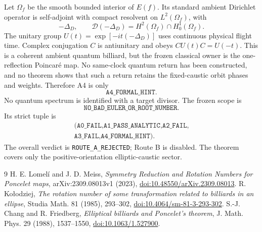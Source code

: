 \documentclass[10pt]{article}
\begin{document}
Let $\Omega_f$ be the smooth bounded interior of $E(f)$.  Its standard ambient
Dirichlet operator is self-adjoint with compact resolvent on
$L^2(\Omega_f)$, with
\[
 -\Delta_D,\qquad
 \mathcal D(-\Delta_D)=H^2(\Omega_f)\cap H_0^1(\Omega_f).
\]
The unitary group $U(t)=\exp[-it(-\Delta_D)]$ uses continuous physical flight
time.  Complex conjugation $C$ is antiunitary and obeys
$CU(t)C=U(-t)$.  This is a coherent ambient quantum billiard, but the frozen
classical owner is the one-reflection Poincar\'e map.  No same-clock quantum
return has been constructed, and no theorem shows that such a return retains
the fixed-caustic orbit phases and weights.  Therefore A4 is only
\[
 \texttt{A4\_FORMAL\_HINT}.
\]
No quantum spectrum is identified with a target divisor.  The frozen scope is
\[
 \texttt{NO\_BAD\_EULER\_OR\_ROOT\_NUMBER}.
\]
Its strict tuple is
\[
 \begin{gathered}
 \texttt{(A0\_FAIL,A1\_PASS\_ANALYTIC,A2\_FAIL,}\\
 \texttt{A3\_FAIL,A4\_FORMAL\_HINT)}.
 \end{gathered}
\]
The overall verdict is \texttt{ROUTE\_A\_REJECTED}; Route B is disabled.  The theorem covers
only the positive-orientation elliptic-caustic sector.
\fi

\begin{thebibliography}{9}
 H. E. Lomel\'i and J. D. Meiss,
\emph{Symmetry Reduction and Rotation Numbers for Poncelet maps},
arXiv:2309.08013v1 (2023),
\href{https://doi.org/10.48550/arXiv.2309.08013}{doi:10.48550/arXiv.2309.08013}.
 R. Ko\l odziej,
\emph{The rotation number of some transformation related to billiards in an ellipse},
Studia Math. 81 (1985), 293--302,
\href{https://doi.org/10.4064/sm-81-3-293-302}{doi:10.4064/sm-81-3-293-302}.
 S.-J. Chang and R. Friedberg,
\emph{Elliptical billiards and Poncelet's theorem},
J. Math. Phys. 29 (1988), 1537--1550,
\href{https://doi.org/10.1063/1.527900}{doi:10.1063/1.527900}.
\end{thebibliography}
\end{document}
